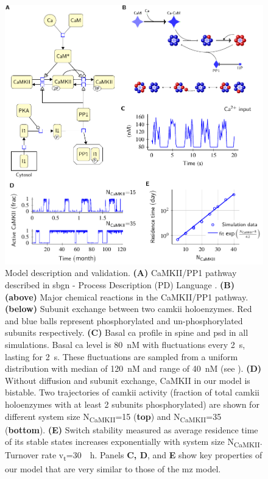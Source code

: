 \documentclass[9pt,lineno,doublespacing]{elife}
\newcommand\SUB[2]{#1\textsubscript{#2}}
\begin{document}
\begin{figure}[t]%
    \includegraphics[width=0.95\linewidth]{./PaperFigures/elifeFigure1/figure_validation_178mm.pdf}
    \caption{Model description and validation. \textbf{(A)} CaMKII/PP1
        pathway described in \gls{sbgn} - Process Description (PD) Language \citep{novere_systems_2009}. 
        \textbf{(B)} \textbf{(above)} Major chemical reactions in the CaMKII/PP1 pathway. 
        \textbf{(below)} Subunit exchange between two \gls{camkii} holoenzymes. Red
        and blue balls represent phosphorylated and un-phosphorylated subunits
        respectively.  \textbf{(C)} Basal \gls{ca} profile in spine and
        \gls{psd} in all simulations. Basal \gls{ca} level is \SI{80}{\nano M} with fluctuations
        every \SI{2}{\second}, lasting for \SI{2}{\second}. These fluctuations are sampled from a uniform
        distribution with median of \SI{120}{\nano M} and range  of
        \SI{40}{\nano M} (see ).
        \textbf{(D)} Without diffusion and subunit exchange, CaMKII in our model is bistable.
        Two trajectories of \gls{camkii} activity (fraction of total \gls{camkii}
        holoenzymes with at least 2 subunits phosphorylated) are shown for different system
        size \SUB{N}{CaMKII}=15 (\textbf{top}) and \SUB{N}{CaMKII}=35 (\textbf{bottom}).
        \textbf{(E)} Switch stability measured as average residence time of
        its stable states increases exponentially with system size \SUB{N}{CaMKII}.
        Turnover rate \SUB{v}{t}=\SI{30}{\per \hour}. Panels \textbf{C, D}, and
        \textbf{E} show key properties of our model that are very similar to those of the \gls{mz} 
        model.}\label{fig:validation} 
\end{figure}
\end{document}
